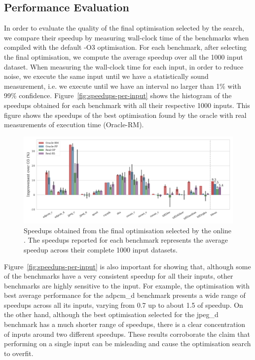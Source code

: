 \subsection{Performance Evaluation}

In order to evaluate the quality of the final optimisation selected by the {\itercomp} search, we compare their speedup by measuring wall-clock time of the benchmarks when compiled with the default {\flagstype -O3} optimisation.
For each benchmark, after selecting the final optimisation, we compute the average speedup over all the 1000 input dataset.
When measuring the wall-clock time for each input, in order to reduce noise, we execute the same input until we have a statistically sound measurement, i.e. we execute until we have an interval no larger than 1\% with 99\% confidence.
Figure~\ref{fig:speedups-per-input} shows the histogram of the speedups obtained for each benchmark with all their respective 1000 inputs.
This figure shows the speedups of the best optimisation found by the oracle with real measurements of execution time (Oracle-RM).

\begin{figure}[htb]
    \centering
    \includegraphics[width=\textwidth]{figs/speedups.pdf}
    \caption{Speedups obtained from the final optimisation selected by the online {\itercomp}.
	         The speedups reported for each benchmark represents the average speedup across their complete 1000 input datasets.}
    \label{fig:speedups}
\end{figure}
 
Figure~\ref{fig:speedups-per-input} is also important for showing that, although some of the benchmarks have a very consistent speedup for all their inputs,
other benchmarks are highly sensitive to the input.
For example, the optimisation with best average performance for the {\flagstype adpcm\_d} benchmark presents a wide range of speedups across all its inputs,
varying from 0.7 up to about 1.5 of speedup.
On the other hand, although the best optimisation selected for the {\flagstype jpeg\_d} benchmark has a much shorter range of speedups, there is a clear concentration of inputs around two different speedups.
These results corroborate the claim that performing {\itercomp} on a single input can be misleading and cause the optimisation search to overfit.


